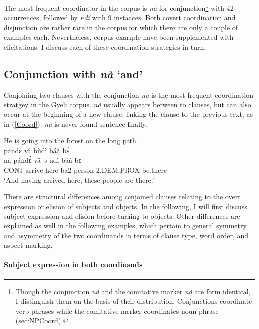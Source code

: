 The most frequent coordinator in the corpus is {\itshape nà} for conjunction\footnote{Though the conjunction {\itshape nà} and the comitative marker {\itshape nà} are form identical, I distinguish them on the basis of their distribution. Conjunctions coordinate verb phrases while the comitative marker coordinates noun phrase ({sec:NPCoord}).} with 42 occurrences, followed by {\itshape ndí} with 9 instances. Both covert coordination and disjunction are rather rare in the corpus for which there are only a couple of examples each. Nevertheless, corpus example have been supplemented with elicitations. I discuss each of these coordination strategies in turn.


\subsection{Conjunction with {\itshape nà} `and'}
\label{sec:Conjunction}

Conjoining two clauses with the conjunction {\itshape nà} is the most frequent coordination stratgey in the Gyeli corpus. {\itshape nà} usually appears between to clauses, but can also occur at the beginning of a new clause, linking the clause to the previous text, as in (\ref{Coord}). 
{\itshape nà} is never found sentence-finally.

\begin{exe} 
\ex\label{Coord} He is going into the forest on the long path.\\
   pándɛ̀ vâ bùdì báà bɛ̀ \\
          nà pándɛ̀ vâ b-ùdì báà bɛ \\
      CONJ arrive here ba2-person 2.DEM.PROX be.there\\
    \trans `And having arrived here, these people are there.'
\end{exe}



There are structural differences among conjoined clauses relating to the overt expression or elision of subjects and objects. In the following, I will first discuss subject expression and elision before turning to objects. Other differences are explained as well in the following examples, which pertain to general symmetry and asymmetry of the two coordinands in terms of clause type, word order, and aspect marking.

\paragraph{Subject expression in both coordinands}

